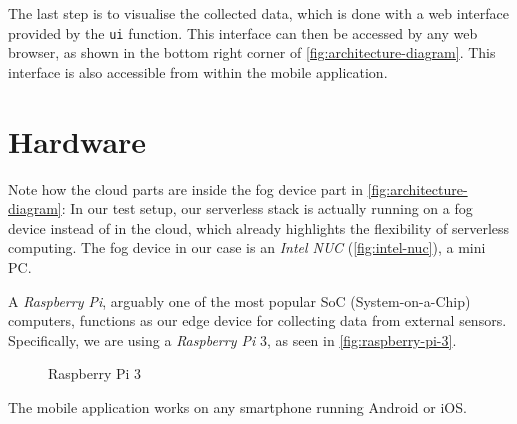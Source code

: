The last step is to visualise the collected data, which is done with a web interface provided by the
\texttt{ui} function. This interface can then be accessed by any web browser, as shown in the bottom
right corner of \autoref{fig:architecture-diagram}. This interface is also accessible from within
the mobile application.

\section{Hardware}

Note how the cloud parts are inside the fog device part in \autoref{fig:architecture-diagram}: In
our test setup, our serverless stack is actually running on a fog device instead of in the cloud,
which already highlights the flexibility of serverless computing. The fog device in our case is an
\textit{Intel NUC} (\autoref{fig:intel-nuc}), a mini PC.

\begin{figure}[H]
  \centering
  \caption{}
  \label{fig:intel-nuc}
\end{figure}

A \textit{Raspberry Pi}, arguably one of the most popular SoC (System-on-a-Chip) computers, functions as our
edge device for collecting data from external sensors. Specifically, we are using a \textit{Raspberry Pi} 3,
as seen in \autoref{fig:raspberry-pi-3}.

\begin{figure}[H]
  \centering
  \caption{Raspberry Pi 3}
  \label{fig:raspberry-pi-3}
\end{figure}

The mobile application works on any smartphone running Android or iOS.
